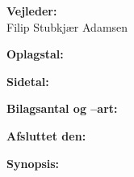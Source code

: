 \begin{titlepage}
\begin{minipage}{0.4\textwidth}
\begin{description}
			\item {\bf Vejleder:}\\
			Filip Stubkjær Adamsen\\

			\item {\bf Oplagstal:} \rprints
			\item {\bf Sidetal:} \rlastpage
			\item {\bf Bilagsantal og --art:} \rappendices
			\item {\bf Afsluttet den:} \rdeadline
		\end{description}
	\end{minipage}
	\hfill
	\begin{minipage}{0.4\textwidth}
		\textbf{Synopsis:}\bigskip\bigskip
		\vfill
		\fbox{
		\begin{minipage}{\textwidth}
			\small 
		\end{minipage}}
	\end{minipage}
	\newline\newline\newline
\end{titlepage}
